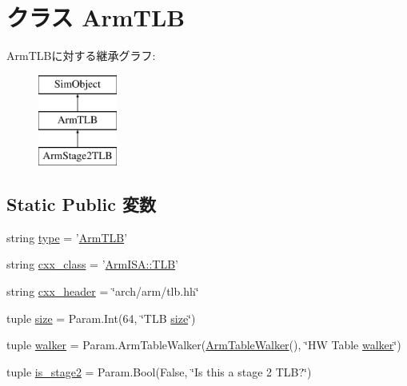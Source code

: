\hypertarget{classArmTLB_1_1ArmTLB}{
\section{クラス ArmTLB}
\label{classArmTLB_1_1ArmTLB}
}
ArmTLBに対する継承グラフ:\begin{figure}[H]
\begin{center}
\leavevmode
\includegraphics[height=3cm]{classArmTLB_1_1ArmTLB}
\end{center}
\end{figure}
\subsection*{Static Public 変数}
\begin{DoxyCompactItemize}
\item 
string \hyperlink{classArmTLB_1_1ArmTLB_acce15679d830831b0bbe8ebc2a60b2ca}{type} = '\hyperlink{classArmTLB_1_1ArmTLB}{ArmTLB}'
\item 
string \hyperlink{classArmTLB_1_1ArmTLB_a58cd55cd4023648e138237cfc0822ae3}{cxx\_\-class} = '\hyperlink{classArmISA_1_1TLB}{ArmISA::TLB}'
\item 
string \hyperlink{classArmTLB_1_1ArmTLB_a17da7064bc5c518791f0c891eff05fda}{cxx\_\-header} = \char`\"{}arch/arm/tlb.hh\char`\"{}
\item 
tuple \hyperlink{classArmTLB_1_1ArmTLB_a377e5da8df1f89c5468c8b8cd07eac89}{size} = Param.Int(64, \char`\"{}TLB \hyperlink{classArmTLB_1_1ArmTLB_a377e5da8df1f89c5468c8b8cd07eac89}{size}\char`\"{})
\item 
tuple \hyperlink{classArmTLB_1_1ArmTLB_a38c6e2cd4db9b456da7637543e59ccbe}{walker} = Param.ArmTableWalker(\hyperlink{classArmTLB_1_1ArmTableWalker}{ArmTableWalker}(), \char`\"{}HW Table \hyperlink{classArmTLB_1_1ArmTLB_a38c6e2cd4db9b456da7637543e59ccbe}{walker}\char`\"{})
\item 
tuple \hyperlink{classArmTLB_1_1ArmTLB_a79c1ca5c107632a64c9583c96fbcc282}{is\_\-stage2} = Param.Bool(False, \char`\"{}Is this a stage 2 TLB?\char`\"{})
\end{DoxyCompactItemize}


